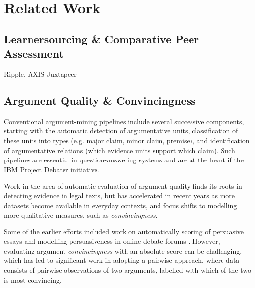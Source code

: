 \documentclass[runningheads]{llncs}
\begin{document}
\section{Related Work}

\subsection{Learnersourcing \& Comparative Peer Assessment}
Ripple\cite{khosravi_ripple_2019}, AXIS\cite{williams_axis:_2016}
Juxtapeer\cite{cambre_juxtapeer:_2018}

\subsection{Argument Quality \& Convincingness}
Conventional argument-mining pipelines include several successive components, 
starting with the automatic detection of argumentative units, classification of 
these units into types (e.g. major claim, minor claim, premise), and 
identification of argumentative relations (which evidence units support which 
claim). Such pipelines are essential in question-answering systems 
\cite{lippi_argumentation_2016} and are at the heart if the IBM Project Debater 
initiative. 

Work in the area of automatic evaluation of argument quality finds its roots in 
 detecting evidence in legal texts\cite{moens_automatic_2007}, but has 
 accelerated in recent years as more datasets become 
available in everyday contexts, and focus shifts to modelling more qualitative 
measures, such as \textit{convincingness}. 

Some of the earlier efforts included work on automatically 
scoring of persuasive essays \cite{persing_end--end_2016} and modelling 
persuasiveness in online debate forums \cite{tan_winning_2016}. However, 
evaluating argument \textit{convincingness} with an absolute score can be 
challenging, which has led to significant work in adopting a pairwise approach, 
where data consists of pairwise observations of two arguments, labelled with 
which of the two is most convincing.


	
	
	
	
\end{document}
